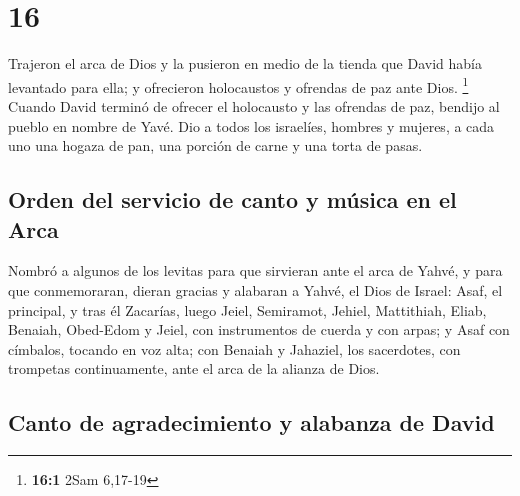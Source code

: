 \hypertarget{section-15}{%
\section{16}\label{section-15}}

 Trajeron el arca de Dios y la pusieron en medio de la
tienda que David había levantado para ella; y ofrecieron holocaustos y
ofrendas de paz ante Dios. \footnote{\textbf{16:1} 2Sam 6,17-19}
 Cuando David terminó de ofrecer el holocausto y las
ofrendas de paz, bendijo al pueblo en nombre de Yavé.  Dio
a todos los israelíes, hombres y mujeres, a cada uno una hogaza de pan,
una porción de carne y una torta de pasas.

\hypertarget{orden-del-servicio-de-canto-y-muxfasica-en-el-arca}{%
\subsection{Orden del servicio de canto y música en el
Arca}\label{orden-del-servicio-de-canto-y-muxfasica-en-el-arca}}

 Nombró a algunos de los levitas para que sirvieran ante
el arca de Yahvé, y para que conmemoraran, dieran gracias y alabaran a
Yahvé, el Dios de Israel:  Asaf, el principal, y tras él
Zacarías, luego Jeiel, Semiramot, Jehiel, Mattithiah, Eliab, Benaiah,
Obed-Edom y Jeiel, con instrumentos de cuerda y con arpas; y Asaf con
címbalos, tocando en voz alta;  con Benaiah y Jahaziel,
los sacerdotes, con trompetas continuamente, ante el arca de la alianza
de Dios.

\hypertarget{canto-de-agradecimiento-y-alabanza-de-david}{%
\subsection{Canto de agradecimiento y alabanza de
David}\label{canto-de-agradecimiento-y-alabanza-de-david}}

